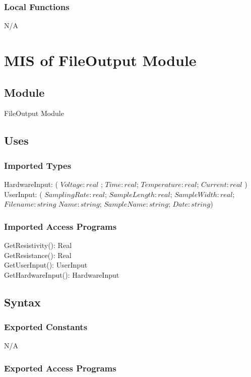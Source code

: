 \documentclass[12pt, titlepage]{article}
\begin{document}
\subsubsection{Local Functions}
N/A

\newpage

\section{MIS of FileOutput Module} \label{FO} 

\subsection{Module}

FileOutput Module

\subsection{Uses}

\subsubsection{Imported Types}

HardwareInput: ( $Voltage: real $ ; $Time: real$; $Temperature: real$; $Current: real$ )\\
UserInput: ( $SamplingRate: real$; $SampleLength: real$; $SampleWidth: real$; $Filename: string$ $Name: string$; $SampleName: string$; $Date: string$)

\subsubsection{Imported Access Programs}
  GetResistivity(): Real\\
  GetResistance(): Real\\
  GetUserInput(): UserInput\\
  GetHardwareInput(): HardwareInput

\subsection{Syntax}

\subsubsection{Exported Constants}

N/A

\subsubsection{Exported Access Programs}
\end{document}
